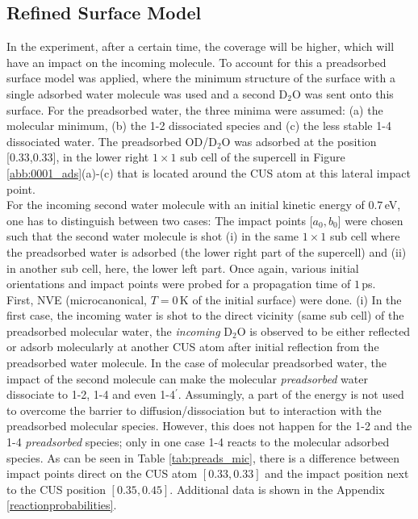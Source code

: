 \documentclass[11pt,DIV=13,BCOR=5mm,a4paper,headinclude]{scrbook}
\begin{document}
\subsection{Refined Surface Model}
In the experiment, after a certain time, the coverage will be higher, which will have an impact on the incoming molecule.
To account for this a preadsorbed surface model was applied, where the minimum structure of the surface with a single adsorbed water molecule was used and a second D$_2$O was sent onto this surface.
For the preadsorbed water, the three minima were assumed: (a) the molecular minimum, (b) the 1-2 dissociated species and (c) the less stable 1-4 dissociated water.
The preadsorbed OD/D$_2$O was adsorbed at the position [0.33,0.33], in the lower right $1\times 1$ sub cell of the supercell in Figure \ref{abb:0001_ads}(a)-(c) that is located around the CUS atom at this lateral impact point.
\\
For the incoming second water molecule with an initial kinetic energy of $0.7\,$eV, one has to distinguish between two cases:
The impact points [$a_0,b_0$] were chosen such that the second water molecule is shot (i) in the same $1\times 1$ sub cell where the preadsorbed water is adsorbed (the lower right part of the supercell) and (ii) in another sub cell, here, the lower left part.
Once again, various initial orientations and impact points were probed for a propagation time of $1\,$ps.
\\
First, NVE (microcanonical, $T=0\,$K of the initial surface) were done.
(i) In the first case, the incoming water is shot to the direct vicinity (same sub cell) of the preadsorbed molecular water, the  \textit{incoming} D$_2$O is observed to be either reflected or adsorb molecularly at another CUS atom after initial reflection from the preadsorbed water molecule.
In the case of molecular preadsorbed water, the impact of the second molecule can make the molecular \textit{preadsorbed} water dissociate to 1-2, 1-4 and even 1-4$^\prime$.
Assumingly, a part of the energy is not used to overcome the barrier to diffusion/dissociation but to interaction with the preadsorbed molecular species.
However, this does not happen for the 1-2 and the 1-4 \textit{preadsorbed} species; only in one case 1-4 reacts to the molecular adsorbed species.
As can be seen in Table \ref{tab:preads_mic}, there is a difference between impact points direct on the CUS atom $[0.33,0.33]$ and the impact position next to the CUS position $[0.35,0.45]$.
Additional data is shown in the Appendix \ref{reactionprobabilities}.
\end{document}
